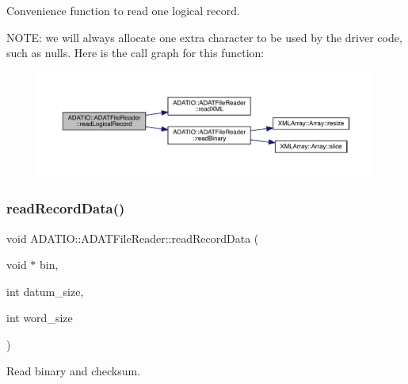 Convenience function to read one logical record. 

N\+O\+TE\+: we will always allocate one extra character to be used by the driver code, such as nulls. Here is the call graph for this function\+:
\nopagebreak
\begin{figure}[H]
\begin{center}
\leavevmode
\includegraphics[width=350pt]{db/de5/group__qio_ga7d36d6dd7fef90986d0c435ddaa86eae_cgraph}
\end{center}
\end{figure}
\mbox{\label{group__qio_ga525c9902a7ee7ebe41c688897da0652e}} 
\subsubsection{\texorpdfstring{readRecordData()}{readRecordData()}}
{\footnotesize\ttfamily void A\+D\+A\+T\+I\+O\+::\+A\+D\+A\+T\+File\+Reader\+::read\+Record\+Data (\begin{DoxyParamCaption}\item[{void $\ast$}]{bin,  }\item[{int}]{datum\+\_\+size,  }\item[{int}]{word\+\_\+size }\end{DoxyParamCaption})\hspace{0.3cm}{\ttfamily [protected]}}



Read binary and checksum. 

